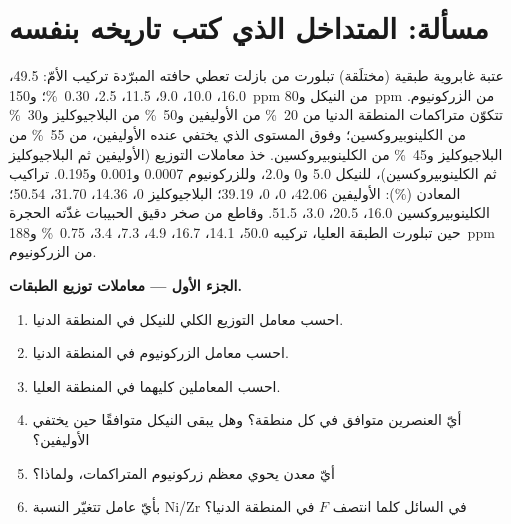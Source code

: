 \section{مسألة: المتداخل الذي كتب تاريخه بنفسه}

\begin{problem}
\label{pb:b2:magmatic-differentiation:1}
عتبة غابروية طبقية (مختلَقة) تبلورت من بازلت تعطي حافته المبرّدة
تركيب الأمّ:  49.5،  16.0،  10.0،
 9.0،  11.5،  2.5،  \qty{0.30}{\percent}؛
و\qty{150}{ppm} من النيكل و\qty{80}{ppm} من الزركونيوم. تتكوّن متراكمات المنطقة الدنيا من
\qty{20}{\percent} من الأوليفين و\qty{50}{\percent} من البلاجيوكليز و\qty{30}{\percent} من
الكلينوبيروكسين؛ وفوق المستوى الذي يختفي عنده الأوليفين، من \qty{55}{\percent} من
البلاجيوكليز و\qty{45}{\percent} من الكلينوبيروكسين. خذ معاملات التوزيع
(الأوليفين ثم البلاجيوكليز ثم الكلينوبيروكسين)، للنيكل 5.0 و0 و2.0، وللزركونيوم 0.0007 و0.001
و0.195. تراكيب المعادن (\unit{\percent}): الأوليفين  42.06،  0،
 0،  39.19؛ البلاجيوكليز 0، 14.36، 31.70، 50.54؛ الكلينوبيروكسين
16.0، 20.5، 3.0، 51.5. وقاطع
من صخر دقيق الحبيبات غذّته الحجرة حين تبلورت الطبقة العليا، تركيبه
 50.0،  14.1،  16.7،  4.9،  7.3،
 3.4،  \qty{0.75}{\percent} و\qty{188}{ppm} من الزركونيوم.

\noindent\textbf{الجزء الأول --- معاملات توزيع الطبقات.}
\begin{enumerate}
\item احسب معامل التوزيع الكلي للنيكل في المنطقة الدنيا.
\item احسب معامل الزركونيوم في المنطقة الدنيا.
\item احسب المعاملين كليهما في المنطقة العليا.
\item أيّ العنصرين متوافق في كل منطقة؟ وهل يبقى النيكل متوافقًا حين
يختفي الأوليفين؟
\item أيّ معدن يحوي معظم زركونيوم المتراكمات، ولماذا؟
\item بأيّ عامل تتغيّر النسبة Ni/Zr في السائل كلما انتصف $F$ في المنطقة
الدنيا؟
\end{enumerate}


\end{problem}
